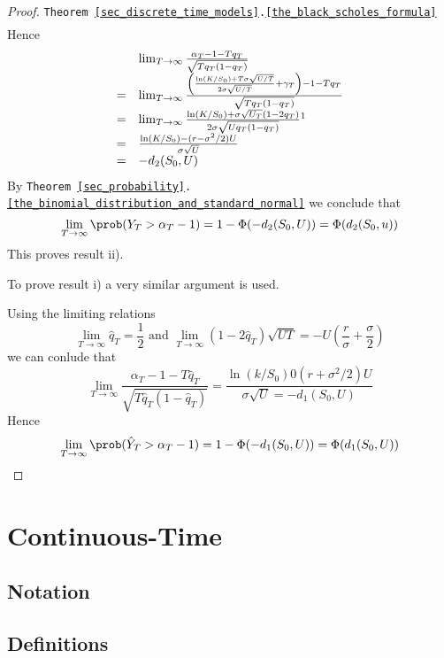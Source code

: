 \documentclass[11pt,a4paper]{article}
\begin{document}
\begin{proof}{\texttt{Theorem  \ref{sec_discrete_time_models}.\ref{the_black_scholes_formula}}}
\[\begin{array}{rcl}
  \end{array}\]
  Hence
  \[\begin{array}{rl}
    &\lim_{T\to\infty}\frac{\alpha_T-1-Tq_T}{\sqrt{Tq_T(1-q_T)}}\\
    =&\lim_{T\to\infty}\frac{\left(\frac{\ln(K/S_0)+T\sigma\sqrt{U/T}}{2\sigma\sqrt{U/T}}+\gamma_T\right)-1-Tq_T}{\sqrt{Tq_T(1-q_T)}}\\
    =&\lim_{T\to\infty}\frac{\ln(K/S_0)+\sigma\sqrt{U_T}(1-2q_T)}{2\sigma\sqrt{Uq_T(1-q_T)}}\footnotemark\\
    =&\frac{\ln(K/S_0)-(r-\sigma^2/2)U}{\sigma\sqrt{U}}\\
    =&-d_2(S_0,U)
  \end{array}\]
  By \texttt{Theorem \ref{sec_probability}.\ref{the_binomial_distribution_and_standard_normal}} we conclude that
  \[ \lim_{T\to\infty}\prob(Y_T>\alpha_T-1)=1-\Phi(-d_2(S_0,U))=\Phi(d_2(S_0,u)) \]
  This proves result ii).
  \par To prove result i) a very similar argument is used.
  \par Using the limiting relations
  \[ \lim_{T\to\infty}\hat{q}_T=\frac12\text{ and }\lim_{T\to\infty}(1-2\hat{q}_T)\sqrt{UT}=-U\left(\frac{r}\sigma+\frac\sigma2\right) \]
  we can conlude that
  \[ \lim_{T\to\infty}\frac{\alpha_T-1-T\hat{q}_T}{\sqrt{T\hat{q}_T(1-\hat{q}_T)}}=\frac{\ln(k/S_0)0(r+\sigma^2/2)U}{\sigma\sqrt{U}=-d_1(S_0,U)} \]
  Hence
  \[ \lim_{T\to\infty}\prob(\hat{Y}_T>\alpha_T-1)=1-\Phi(-d_1(S_0,U))=\Phi(d_1(S_0,U)) \]
  \proved
\end{proof}

\section{Continuous-Time}\label{sec_continuous_time_models}


\subsection{Notation}

\subsection{Definitions}
\end{document}
